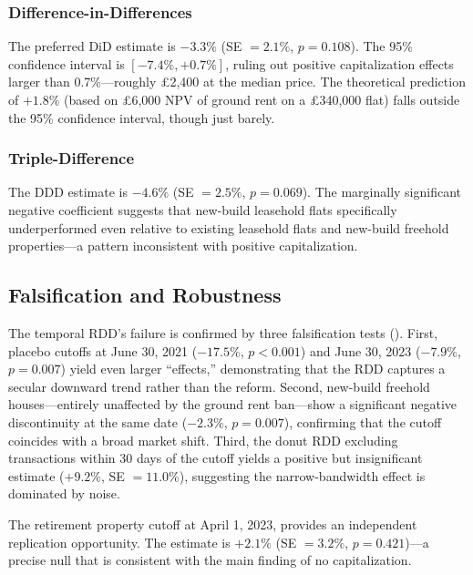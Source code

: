 \documentclass[12pt]{article}
\begin{document}


\subsubsection*{Difference-in-Differences} The preferred DiD estimate is $-3.3\%$ (SE $= 2.1\%$, $p = 0.108$). The 95\% confidence interval is $[-7.4\%, +0.7\%]$, ruling out positive capitalization effects larger than 0.7\%---roughly \pounds 2,400 at the median price. The theoretical prediction of $+1.8\%$ (based on \pounds 6,000 NPV of ground rent on a \pounds 340,000 flat) falls outside the 95\% confidence interval, though just barely.

\subsubsection*{Triple-Difference} The DDD estimate is $-4.6\%$ (SE $= 2.5\%$, $p = 0.069$). The marginally significant negative coefficient suggests that new-build leasehold flats specifically underperformed even relative to existing leasehold flats and new-build freehold properties---a pattern inconsistent with positive capitalization.



\subsection{Falsification and Robustness}

The temporal RDD's failure is confirmed by three falsification tests (). First, placebo cutoffs at June 30, 2021 ($-17.5\%$, $p < 0.001$) and June 30, 2023 ($-7.9\%$, $p = 0.007$) yield even larger ``effects,'' demonstrating that the RDD captures a secular downward trend rather than the reform. Second, new-build freehold houses---entirely unaffected by the ground rent ban---show a significant negative discontinuity at the same date ($-2.3\%$, $p = 0.007$), confirming that the cutoff coincides with a broad market shift. Third, the donut RDD excluding transactions within 30 days of the cutoff yields a positive but insignificant estimate ($+9.2\%$, SE $= 11.0\%$), suggesting the narrow-bandwidth effect is dominated by noise.

The retirement property cutoff at April 1, 2023, provides an independent replication opportunity. The estimate is $+2.1\%$ (SE $= 3.2\%$, $p = 0.421$)---a precise null that is consistent with the main finding of no capitalization.
\end{document}
